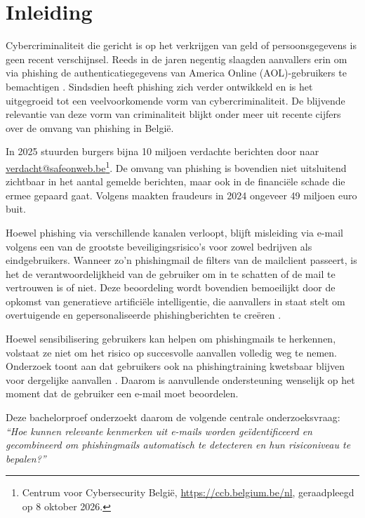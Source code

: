 
\section{Inleiding}%
\label{sec:inleiding}
Cybercriminaliteit die gericht is op het verkrijgen van geld of persoonsgegevens is geen recent verschijnsel. Reeds in de jaren negentig slaagden aanvallers erin om via phishing de authenticatiegegevens van America Online (AOL)-gebruikers te bemachtigen \autocite{Goel2018}. Sindsdien heeft phishing zich verder ontwikkeld en is het uitgegroeid tot een veelvoorkomende vorm van cybercriminaliteit. De blijvende relevantie van deze vorm van criminaliteit blijkt onder meer uit recente cijfers over de omvang van phishing in België.

In 2025 stuurden burgers bijna 10 miljoen verdachte berichten door naar \url{verdacht@safeonweb.be}\footnote{Centrum voor Cybersecurity België, \url{https://ccb.belgium.be/nl}, geraadpleegd op 8 oktober 2026.}. De omvang van phishing is bovendien niet uitsluitend zichtbaar in het aantal gemelde berichten, maar ook in de financiële schade die ermee gepaard gaat. Volgens \textcite{Febelfin2025} maakten fraudeurs in 2024 ongeveer 49 miljoen euro buit.

Hoewel phishing via verschillende kanalen verloopt, blijft misleiding via e-mail volgens \textcite{Veit2025} een van de grootste beveiligingsrisico's voor zowel bedrijven als eindgebruikers. Wanneer zo'n phishingmail de filters van de mailclient passeert, is het de verantwoordelijkheid van de gebruiker om in te schatten of de mail te vertrouwen is of niet. Deze beoordeling wordt bovendien bemoeilijkt door de opkomst van generatieve artificiële intelligentie, die aanvallers in staat stelt om overtuigende en gepersonaliseerde phishingberichten te creëren \autocite{SchmittFlechais2024}.

Hoewel sensibilisering gebruikers kan helpen om phishingmails te herkennen, volstaat ze niet om het risico op succesvolle aanvallen volledig weg te nemen. Onderzoek toont aan dat gebruikers ook na phishing\-training kwetsbaar blijven voor dergelijke aanvallen \autocite{Marshall2024}. 
Daarom is aanvullende ondersteuning wenselijk op het moment dat de gebruiker een e-mail moet beoordelen. 

Deze bachelorproef onderzoekt daarom de volgende centrale onderzoeksvraag: \emph{``Hoe kunnen relevante kenmerken uit e-mails worden geïdentificeerd en gecombineerd om phishingmails automatisch te detecteren en hun risiconiveau te bepalen?''}

